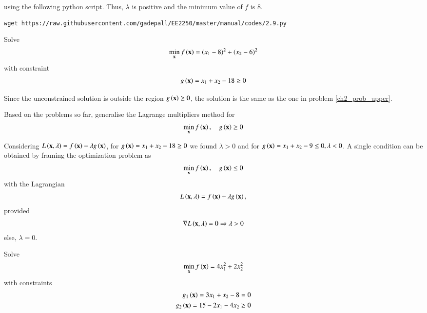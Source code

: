 \documentclass[journal,12pt,twocolumn]{IEEEtran}
\begin{document}
%
using the following python script.  Thus, $\lambda$ is positive and the minimum value of $f$ is 8.
%	
\begin{lstlisting}
wget https://raw.githubusercontent.com/gadepall/EE2250/master/manual/codes/2.9.py
\end{lstlisting}

%
%
\begin{problem}
\label{ch2_prob_upper_cond}
Solve
	 \begin{align}
	\min_{\mathbf{x}} f\left(\mathbf{x}\right) = (x_1-8)^2 + (x_2-6)^2
	 \end{align}
	 with constraint
	 \begin{align}
	 g\left(\mathbf{x}\right) = x_1 + x_2 - 18 \geq 0 
	 \end{align}
\end{problem}	 
%
\solution Since the unconstrained solution is outside the region $g\left(\mathbf{x}\right) \geq 0$, the solution is the same as the one in problem \ref{ch2_prob_upper}.
%
\begin{problem}
Based on the problems so far, generalise the Lagrange multipliers method for 
%
	 \begin{align}
	 \label{ch2_lagrange_ineq}
	\min_{\mathbf{x}} f\left(\mathbf{x}\right) , \quad 
	 g\left(\mathbf{x}\right)  \geq 0 
	 \end{align}
%
\end{problem}
%
\solution
Considering $L\left(\mathbf{x},\lambda\right) = f\left(\mathbf{x}\right) - \lambda g\left(\mathbf{x}\right)$, for $g\left(\mathbf{x}\right) = x_1 + x_2 - 18 \geq 0$ we found $\lambda > 0 $ and for $g\left(\mathbf{x}\right) = x_1 + x_2 - 9 \leq 0, \lambda < 0$. A single condition can be obtained by framing the optimization problem as
%
	 \begin{align}
	 \label{ch2_lagrange_ineq_summary}
	\min_{\mathbf{x}} f\left(\mathbf{x}\right) , \quad 
	 g\left(\mathbf{x}\right)  \leq 0 
	 \end{align}
%
with the Lagrangian
%
\begin{equation}
L\brak{\mbf{x},\lambda} = f\brak{\mbf{x}} + \lambda g\brak{\mbf{x}}, %
\end{equation}
%
provided
%
\begin{equation}
\label{ch2_kkt_necessary}
\nabla L\left(\mathbf{x},\lambda\right) = 0 \Rightarrow \lambda > 0
\end{equation}
else, $\lambda = 0$.
\begin{problem}
Solve
 \begin{align}
 \label{ch2_kkt_problem}
\min_{\mathbf{x}} f\left(\mathbf{x}\right) = 4x_1^2 + 2x_2^2
 \end{align}
 with constraints
 \begin{align}
 g_1\left(\mathbf{x}\right) = 3x_1 + x_2-8 = 0\\
 g_2 \left(\mathbf{x}\right)= 15 - 2x_1 - 4x_2 \geq 0
 \end{align}
 \end{problem}
\end{document}
